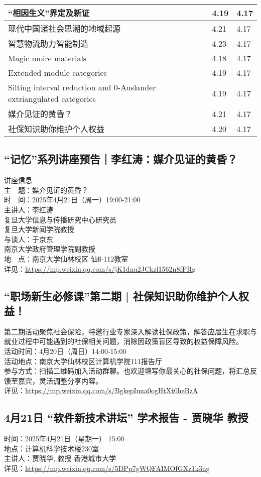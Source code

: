 \documentclass[letterpaper, 12pt]{article}
\begin{document}
\begin{multicols}{2}
\begin{tabular}{|>{\centering\arraybackslash}m{}|m{}|m{}|}
    “相因生义”界定及新证 & 4.19 & 4.17\\\hline
    现代中国诸社会思潮的地域起源 & 4.21 & 4.17\\\hline
    智慧物流助力智能制造 & 4.23 & 4.17\\\hline
    Magic moire materials & 4.18 & 4.17\\\hline
    Extended module categories & 4.19 & 4.17\\\hline
    Silting interval reduction and 0-Auslander extriangulated categories & 4.19 & 4.17\\\hline
    媒介见证的黄昏？ & 4.21 & 4.17\\\hline
    社保知识助你维护个人权益 & 4.20 & 4.17\\\hline
    
\end{tabular}
\subsection{“记忆”系列讲座预告｜李红涛：媒介见证的黄昏？}
讲座信息
\\主　题：媒介见证的黄昏？
\\时　间：2025年4月21日（周一）19:00-21:00
\\主讲人：李红涛
\\ 复旦大学信息与传播研究中心研究员
\\ 复旦大学新闻学院教授
\\与谈人：于京东
\\ 南京大学政府管理学院副教授
\\地　点：南京大学仙林校区 仙Ⅱ-112教室
\\详见：\url{https://mp.weixin.qq.com/s/jK1dnu2JCkzl1562n8fPRg}
\subsection{“职场新生必修课”第二期 | 社保知识助你维护个人权益！}
第二期活动聚焦社会保险，特邀行业专家深入解读社保政策，解答应届生在求职与就业过程中可能遇到的社保相关问题，消除因政策盲区导致的权益保障风险。
\\活动时间：4月20日（周日）14:00-15:00
\\活动地点：南京大学仙林校区计算机学院111报告厅
\\参与方式：扫描二维码加入活动群聊。也欢迎填写你最关心的社保问题，将汇总反馈至嘉宾，灵活调整分享内容。
\\详见：\url{https://mp.weixin.qq.com/s/BgkepInua0ogHtXt0heBzA}
\subsection{4月21日 “软件新技术讲坛” 学术报告 - 贾晓华 教授}
时间：2025年4月21日（星期一） 15:00
\\地点：计算机科学技术楼230室
\\主讲人：贾晓华, 教授 香港城市大学
\\详见：\url{https://mp.weixin.qq.com/s/5DPp7gWQFAIMOfGXz1k3ug}

\end{multicols}
\end{document}
